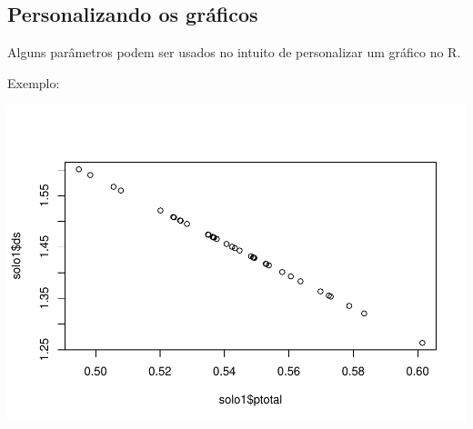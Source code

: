 \documentclass[
]{book}
\newenvironment{Shaded}{\begin{snugshade}}{\end{snugshade}}
\newcommand{\KeywordTok}[1]{\textcolor[rgb]{0.13,0.29,0.53}{\textbf{#1}}}
\newcommand{\NormalTok}[1]{#1}
\newcommand{\OperatorTok}[1]{\textcolor[rgb]{0.81,0.36,0.00}{\textbf{#1}}}
\begin{document}
\hypertarget{personalizando-os-gruxe1ficos}{%
\subsection{Personalizando os gráficos}\label{personalizando-os-gruxe1ficos}}

Alguns parâmetros podem ser usados no intuito de personalizar um gráfico no R.

Exemplo:

\begin{Shaded}
\end{Shaded}

\includegraphics{TudodoR_files/figure-latex/unnamed-chunk-166-1.pdf}
\end{document}
